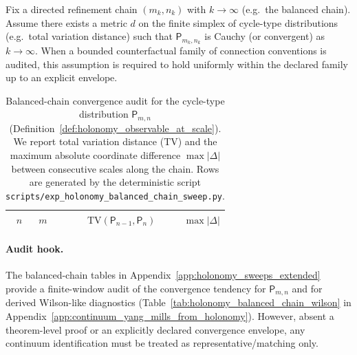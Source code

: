 \begin{assumption}
\label{ass:holonomy_refinement_compatibility_bundle}
\AuditTag Fix a directed refinement chain $(m_k,n_k)$ with $k\to\infty$ (e.g.\ the balanced chain).
Assume there exists a metric $d$ on the finite simplex of cycle-type distributions (e.g.\ total variation distance) such that $\mathsf{P}_{m_k,n_k}$ is Cauchy (or convergent) as $k\to\infty$.
When a bounded counterfactual family of connection conventions is audited, this assumption is required to hold uniformly within the declared family up to an explicit envelope.
\end{assumption}

\begin{table}[H]
\centering
\scriptsize
\setlength{\tabcolsep}{10pt}
\renewcommand{\arraystretch}{1.15}
\begin{tabular}{rrrr}
\toprule
$n$ & $m$ & $\mathrm{TV}(\mathsf{P}_{n-1},\mathsf{P}_n)$ & $\max|\Delta|$ \\
\midrule
%
\end{tabular}
\caption{Balanced-chain convergence audit for the cycle-type distribution $\mathsf{P}_{m,n}$ (Definition~\ref{def:holonomy_observable_at_scale}). We report total variation distance (TV) and the maximum absolute coordinate difference $\max|\Delta|$ between consecutive scales along the chain. Rows are generated by the deterministic script \texttt{scripts/exp\_holonomy\_balanced\_chain\_sweep.py}.}
\label{tab:holonomy_balanced_chain_convergence_audit}
\end{table}

\paragraph{Audit hook.}
\AuditTag The balanced-chain tables in Appendix~\ref{app:holonomy_sweeps_extended} provide a finite-window audit of the convergence tendency for $\mathsf{P}_{m,n}$ and for derived Wilson-like diagnostics (Table~\ref{tab:holonomy_balanced_chain_wilson} in Appendix~\ref{app:continuum_yang_mills_from_holonomy}).
However, absent a theorem-level proof or an explicitly declared convergence envelope, any continuum identification must be treated as representative/matching only.

